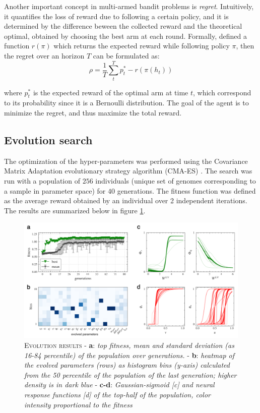 Another important concept in multi-armed bandit problems is \textit{regret}. Intuitively, it quantifies the loss of reward due to following a certain policy, and it is determined by the difference beween the collected reward and the theoretical optimal, obtained by choosing the best arm at each round.
Formally, defined a function $r(\pi)$ which returns the expected reward while following policy $\pi$, then the regret over an horizon $T$ can be formulated as:
\begin{equation}
    \rho = \frac{1}{T}\sum^{T}_{t} p^{*}_{t} -r(\pi(h_{t}))
\end{equation}

\noindent where $p^{*}_{t}$ is the expected reward of the optimal arm at time $t$, which correspond to its probability since it is a Bernoulli distribution.
\noindent The goal of the agent is to minimize the regret, and thus maximize the total reward.



\subsection{Evolution search}
The optimization of the hyper-parameters was performed using the Covariance Matrix Adaptation evolutionary strategy algorithm (CMA-ES) \cite{igelCovarianceMatrixAdaptation2007}.
The search was run with a population of $256$ individuals (unique set of genomes corresponding to a sample in parameter space) for $40$ generations. The fitness function was defined as the average reward obtained by an individual over 2 independent iterations.
The results are summarized below in figure \ref{fig:evolution}.

\begin{figure}[H]
    \centering
    \includegraphics[width=1.0\textwidth]{figures/evolution_comp_1.png}
    \caption{\textsc{Evolution results} - \textbf{a}: \textit{top fitness, mean and standard deviation (as 16-84 percentile) of the population over generations.} - \textbf{b}: \textit{heatmap of the evolved parameters (rows) as histogram bins (y-axis) calculated from the 50 percentile of the
    population of the last generation; higher density is in dark blue} - \textbf{c-d}: \textit{Gaussian-sigmoid [c] and neural response functions [d] of the top-half of the population, color intensity proportional to the fitness}}
    \label{fig:evolution}
\end{figure}

